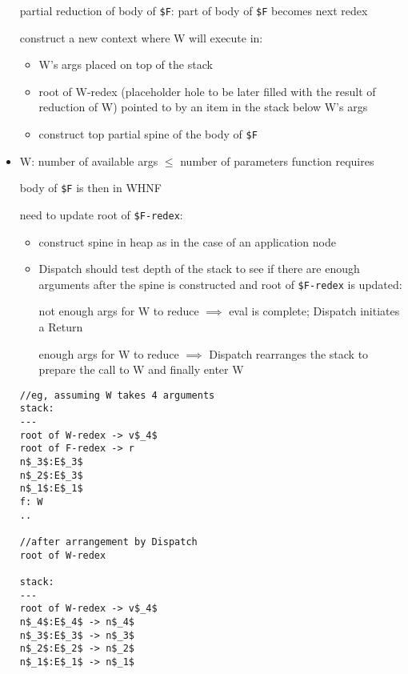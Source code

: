 \documentclass[8pt]{extarticle}
\begin{document}
\begin{multicols*}{2}
\begin{itemize}
  partial reduction of body of \verb|$F|: part of body of \verb|$F| becomes next redex

  construct a new context where W will execute in:
  \begin{itemize}
  \item W's args placed on top of the stack
  \item root of W-redex (placeholder hole to be later filled with the result of reduction of W) pointed to by an item in the stack below W's args
  \item construct top partial spine of the body of \verb|$F|
  \end{itemize}

\item W: number of available args $\leq$ number of parameters function requires

  body of \verb|$F| is then in WHNF

  need to update root of \verb|$F-redex|:

  \begin{itemize}

    \item construct spine in heap as in the case of an application node

    \item Dispatch should test depth of the stack to see if there are enough arguments after the spine is constructed and root of \verb|$F-redex| is updated:

      not enough args for W to reduce $\implies$  eval is complete; Dispatch initiates a Return

      enough args for W to reduce $\implies$ Dispatch rearranges the stack to prepare the call to W and finally enter W
    \end{itemize}

    \begin{lstlisting}
//eg, assuming W takes 4 arguments
stack:
---
root of W-redex -> v$_4$
root of F-redex -> r
n$_3$:E$_3$
n$_2$:E$_3$
n$_1$:E$_1$
f: W
..

//after arrangement by Dispatch
root of W-redex

stack:
---
root of W-redex -> v$_4$
n$_4$:E$_4$ -> n$_4$
n$_3$:E$_3$ -> n$_3$
n$_2$:E$_2$ -> n$_2$
n$_1$:E$_1$ -> n$_1$
    \end{lstlisting}
    

\end{itemize}
\end{multicols*}
\end{document}
